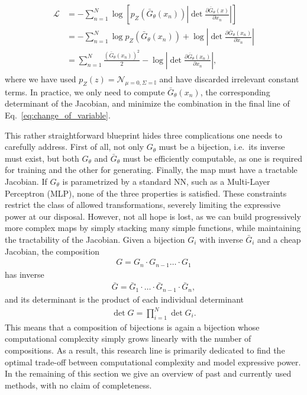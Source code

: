 %
\begin{align}\label{eq:change_of_variable}
\begin{split}
\mathcal{L} &= - \sum_{n=1}^N \log \left[ p_Z(\bar{G} _{\theta}(x_n)) \left|\det \frac{\partial \bar{G} _{\theta}(x)}{\partial x_n}\right| \right]\\
&= -\sum_{n=1}^N \log p_Z(\bar{G} _{\theta}(x_n)) + \log \left|\det \frac{\partial \bar{G} _{\theta}(x_n)}{\partial x_n}\right|\\
&= \sum_{n=1}^N \frac{(\bar{G} _{\theta}(x_n))^2}{2} - \log \left|\det \frac{\partial \bar{G} _{\theta}(x_n)}{\partial x_n}\right|,
\end{split}
\end{align}
%
where we have used $p_{Z}(z) = \mathcal{N}_{\mu=0, \Sigma=\mathbb{I}}$ and have discarded irrelevant constant terms. 
In practice, we only need to compute $\bar{G} _{\theta}(x_n)$, the corresponding determinant of the Jacobian, and minimize the combination in the final line of Eq.~\ref{eq:change_of_variable}.

This rather straightforward blueprint hides three complications one needs to carefully address. First of all, not only $G_{\theta}$ must be a bijection, i.e.\ its inverse must exist, but both $G_{\theta}$ and $\bar{G} _{\theta}$ must be efficiently computable, as one is required for training and the other for generating. Finally, the map must have a tractable Jacobian. If $G_{\theta}$ is parametrized by a standard NN, such as a Multi-Layer Perceptron (MLP), none of the three properties is satisfied. These constraints restrict the class of allowed transformations, severely limiting the expressive power at our disposal.
However, not all hope is lost, as we can build progressively more complex maps by simply stacking many simple functions, while maintaining the tractability of the Jacobian.
Given a bijection $G_{i}$ with inverse $\bar{G}_{i}$ and a cheap Jacobian, the composition
\begin{align}
G = G_{n} \cdot  G_{n-1} \ldots \cdot G_{1}
\end{align}
has inverse
\begin{align}
\bar{G} = \bar{G}_{1} \cdot   \ldots \cdot \bar{G}_{n-1} \cdot \bar{G}_{n},
\end{align}
and its determinant is the product of each individual determinant
\begin{align}
\det G = \prod_{i=1}^{N}  \det G_{i}.
\end{align}
This means that a composition of bijections is again a bijection whose computational complexity simply grows linearly with the number of compositions.
As a result, this research line is primarily dedicated to find the optimal trade-off between computational complexity and model expressive power. 
In the remaining of this section we give an overview of past and currently used methods, with no claim of completeness.

